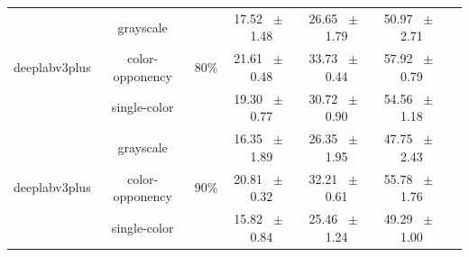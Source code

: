 \begin{table}[h]
\begin{tabular}{@{}lccc ccc@{}}
    \midrule
    \multirow{3}{*}{deeplabv3plus} & grayscale & \multirow{3}{*}{80\%} & 17.52 ~$\pm$~ 1.48 & 26.65 ~$\pm$~ 1.79 & 50.97 ~$\pm$~ 2.71 \\
    & color-opponency & & 21.61 ~$\pm$~ 0.48 & 33.73 ~$\pm$~ 0.44 & 57.92 ~$\pm$~ 0.79 \\
    & single-color & & 19.30 ~$\pm$~ 0.77 & 30.72 ~$\pm$~ 0.90 & 54.56 ~$\pm$~ 1.18 \\
    \midrule
    \multirow{3}{*}{deeplabv3plus} & grayscale & \multirow{3}{*}{90\%} & 16.35 ~$\pm$~ 1.89 & 26.35 ~$\pm$~ 1.95 & 47.75 ~$\pm$~ 2.43 \\
    & color-opponency & & 20.81 ~$\pm$~ 0.32 & 32.21 ~$\pm$~ 0.61 & 55.78 ~$\pm$~ 1.76 \\
    & single-color & & 15.82 ~$\pm$~ 0.84 & 25.46 ~$\pm$~ 1.24 & 49.29 ~$\pm$~ 1.00 \\
    \midrule
    \bottomrule
  \end{tabular}
  \label{tab:sparse_deeplabv3plus_acdc_night}
\end{table}
